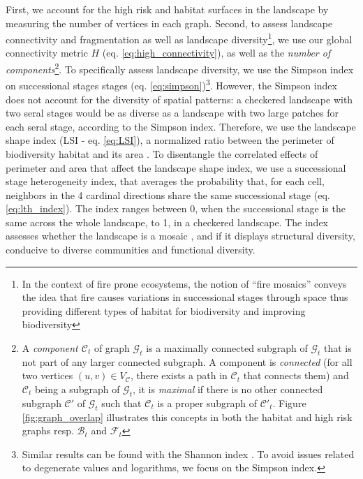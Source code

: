 First, we account for the high risk and habitat surfaces in the landscape by measuring the number of vertices in each graph.
Second, to assess landscape connectivity and fragmentation as well as landscape diversity\footnote{In the context of fire prone ecosystems, the notion of ``fire mosaics'' \citep{bradstock_which_2005} conveys the idea that fire causes variations in successional stages through space thus providing different types of habitat for biodiversity and improving biodiversity}, we use our global connectivity metric $H$ (eq. \ref{eq:high_connectivity}), as well as the \textit{number of components}\footnote{A \textit{component $\mathcal{C}_t$} of graph $\mathcal{G}_t$ is a maximally connected subgraph of $\mathcal{G}_t$ that is not part of any larger connected subgraph. A component is \textit{connected} (for all two vertices $(u,v) \in V_{\mathcal{C}}$, there exists a path in $\mathcal{C}_t$ that connects them) and $\mathcal{C}_t$ being a subgraph of $\mathcal{G}_t$, it is \textit{maximal} if there is no other connected subgraph $\mathcal{C'}$ of $\mathcal{G}_t$ such that $\mathcal{C}_t$ is a proper subgraph of $\mathcal{C'}_t$. Figure \ref{fig:graph_overlap} illustrates this concepts in both the habitat and high risk graphs resp. $\mathcal{B}_t$ and $\mathcal{F}_t$}.
To specifically assess landscape diversity, we use the Simpson index \citep{simpson_measurement_1949} on successional stages stages (eq. \ref{eq:simpson})\footnote{Similar results can be found with the Shannon index \citep{Shannon1949}. To avoid issues related to degenerate values and logarithms, we focus on the Simpson index.}. 
However, the Simpson index does not account for the diversity of spatial patterns: a checkered landscape with two seral stages would be as diverse as a landscape with two large patches for each seral stage, according to the Simpson index. Therefore, we use the landscape shape index (LSI - eq. \ref{eq:LSI}), a normalized ratio between the perimeter of biodiversity habitat and its area \citep{patton_diversity_1975, McGarigal_1995}.
To disentangle the correlated effects of perimeter and area that affect the landscape shape index, we use a successional stage heterogeneity index, that averages the probability that, for each cell, neighbors in the 4 cardinal directions share the same successional stage (eq. \ref{eq:lth_index}). The index ranges between 0, when the successional stage is the same across the whole landscape, to 1, in a checkered landscape. The index assesses whether the landscape is a mosaic \citep{bradstock_which_2005}, and if it displays structural diversity, conducive to diverse communities and functional diversity. 

